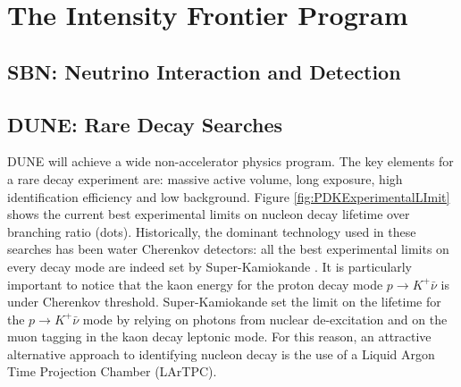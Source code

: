 \section{The Intensity Frontier Program}
\subsection{SBN: Neutrino Interaction and Detection}
\subsection{DUNE: Rare Decay Searches}
DUNE will achieve a wide non-accelerator physics program.
The key elements for a rare decay experiment are: massive active volume, long exposure, high identification efficiency and low background. 
Figure \ref{fig:PDKExperimentalLImit} shows the current best experimental limits on nucleon decay lifetime over branching ratio (dots). Historically, the dominant technology used in these searches has been water Cherenkov detectors: all the best experimental limits on every decay mode are indeed set by Super-Kamiokande \cite{PhysRevD.90.072005,PhysRevLett.115.121803}.  It is particularly important to notice that the kaon energy for the proton decay mode $p \rightarrow K^+ \bar{\nu}$ is under Cherenkov threshold.  Super-Kamiokande set the limit on the lifetime for the $p \rightarrow K^+ \bar{\nu}$ mode by  relying  on photons from nuclear de-excitation and on the muon tagging in the kaon decay leptonic mode. For this reason, an attractive alternative approach to identifying nucleon decay is the use of a Liquid Argon Time Projection Chamber (LArTPC). 

